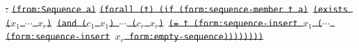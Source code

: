 \documentclass[10pt,fleqn,final]{scrreprt}
\newenvironment{definitions}[0]{\medskip }{}
\newcommand{\white}[1]{{\color{white}{#1}}}
\newcommand{\qqquad}{\white{x}\qquad}
\providecommand{\DIFdel}[1]{{\protect\color{red}\sout{#1}}}                      %
\providecommand{\DIFdelend}{} %
\begin{document}
\begin{definitions}
\begin{itemize}[topsep=0pt, label=--, leftmargin=*]
\addtocounter{footnote}{-1}%
\DIFdel{:}%
\texttt{\DIFdel{(from:Sequence a)}}%
\texttt{\DIFdel{(forall (t) (if (form:sequence-member t a)}%
\DIFdel{(exists ($x_1$ $\cdots$ $x_r$)}%
\DIFdel{(and ($c_1$ $x_1$) $\cdots$ ($c_r$ $x_r$)}%
\DIFdel{(= t (form:sequence-insert $x_1$ ($\cdots$ (form:sequence-insert}%
\DIFdel{$x_r$ form:empty-sequence))))))))}}
\DIFdelend 


\end{itemize}
\end{definitions}
\end{document}
